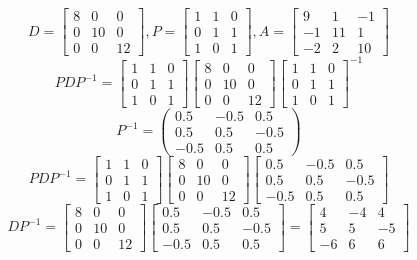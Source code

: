 \documentclass[12pt]{extarticle} %
\begin{document}
\begin{enumerate}
    \[
    D = \begin{bmatrix} 8 & 0 & 0\\ 0 & 10 & 0 \\ 0 & 0 & 12 \end{bmatrix}, P = \begin{bmatrix} 1 & 1 & 0\\ 0 & 1 & 1 \\ 1 & 0 & 1 \end{bmatrix}, A = \begin{bmatrix} 9 & 1 & -1\\ -1 & 11 & 1 \\ -2 & 2 & 10 \end{bmatrix}
    \]
    \[
    PDP^{-1} = \begin{bmatrix} 1 & 1 & 0\\ 0 & 1 & 1 \\ 1 & 0 & 1 \end{bmatrix} \begin{bmatrix} 8 & 0 & 0\\ 0 & 10 & 0 \\ 0 & 0 & 12 \end{bmatrix} \begin{bmatrix} 1 & 1 & 0\\ 0 & 1 & 1 \\ 1 & 0 & 1 \end{bmatrix}^{-1}
    \]
    \[
    P^{-1} = \begin{pmatrix}
        0.5 & -0.5 & 0.5 \\
        0.5 & 0.5 & -0.5 \\
        -0.5 & 0.5 & 0.5
    \end{pmatrix}
    \]
    \[
    PDP^{-1} = \begin{bmatrix} 1 & 1 & 0\\ 0 & 1 & 1 \\ 1 & 0 & 1 \end{bmatrix} \begin{bmatrix} 8 & 0 & 0\\ 0 & 10 & 0 \\ 0 & 0 & 12 \end{bmatrix} \begin{bmatrix} 0.5 & -0.5 & 0.5 \\ 0.5 & 0.5 & -0.5 \\ -0.5 & 0.5 & 0.5 \end{bmatrix}
    \]
    \[
    DP^{-1} = \begin{bmatrix} 8 & 0 & 0\\ 0 & 10 & 0 \\ 0 & 0 & 12 \end{bmatrix}\begin{bmatrix} 0.5 & -0.5 & 0.5 \\ 0.5 & 0.5 & -0.5 \\ -0.5 & 0.5 & 0.5 \end{bmatrix} = \begin{bmatrix} 4 & -4 & 4\\ 5 & 5  & -5 \\ -6 & 6 & 6 \end{bmatrix}
\]
\end{enumerate}
\end{document}
